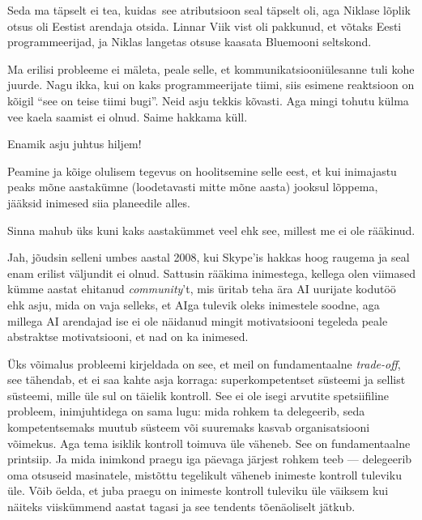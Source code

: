 Seda ma täpselt ei tea, kuidas see atributsioon seal täpselt oli, aga Niklase 
lõplik otsus oli Eestist arendaja otsida. 
Linnar Viik vist oli pakkunud, et võtaks Eesti 
programmeerijad, ja Niklas langetas otsuse kaasata Bluemooni 
seltskond.


Ma erilisi probleeme ei mäleta, peale 
selle, et kommunikatsiooniülesanne tuli kohe juurde. Nagu ikka, kui on kaks 
programmeerijate tiimi, siis esimene reaktsioon on kõigil \enquote{see on 
teise tiimi bugi}. Neid asju tekkis kõvasti. Aga 
mingi tohutu külma vee kaela saamist ei olnud. Saime hakkama küll. 


Enamik asju juhtus hiljem!


Peamine ja kõige olulisem tegevus on hoolitsemine selle eest, et kui 
inimajastu peaks mõne aastakümne (loodetavasti mitte mõne aasta) jooksul 
lõppema, jääksid inimesed siia planeedile alles.


Sinna mahub üks kuni kaks aastakümmet veel ehk see, millest me ei ole 
rääkinud. 


Jah, jõudsin selleni umbes aastal 2008, kui Skype'is hakkas hoog 
raugema ja seal enam erilist väljundit ei olnud. Sattusin rääkima 
inimestega, kellega olen viimased kümme aastat ehitanud 
\emph{community}'t, mis üritab teha ära AI uurijate kodutöö ehk 
asju, mida on vaja selleks, et AIga tulevik oleks inimestele soodne, aga 
millega AI arendajad ise ei ole näidanud mingit motivatsiooni tegeleda peale 
abstraktse motivatsiooni, et nad on ka inimesed.

Üks võimalus probleemi kirjeldada on see, et meil on fundamentaalne 
\emph{trade-off}, see tähendab, et ei saa 
kahte asja korraga: superkompetentset süsteemi ja sellist süsteemi, mille 
üle sul on täielik kontroll. See ei ole isegi arvutite spetsiifiline probleem, 
inimjuhtidega on sama lugu: mida rohkem ta delegeerib, seda 
kompetentsemaks muutub süsteem või suuremaks kasvab organisatsiooni võimekus. 
Aga tema isiklik kontroll toimuva üle väheneb. See on fundamentaalne 
printsiip. Ja mida inimkond praegu iga päevaga järjest rohkem teeb --- 
delegeerib oma otsuseid masinatele, mistõttu tegelikult 
väheneb inimeste kontroll tuleviku üle. Võib öelda, et juba praegu on inimeste 
kontroll tuleviku üle väiksem kui näiteks viiskümmend aastat tagasi ja see tendents tõenäoliselt jätkub. 

